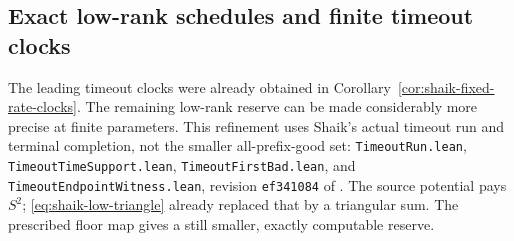\documentclass[11pt]{article}
\theoremstyle{remark}\newtheorem{remark}[proposition]{Remark}
\begin{document}
\subsection{Exact low-rank schedules and finite timeout clocks}
\label{subsec:shaik-low-schedule}
The leading timeout clocks were already obtained in
Corollary~\ref{cor:shaik-fixed-rate-clocks}. The remaining low-rank
reserve can be made considerably more precise at finite parameters.
This refinement uses Shaik's actual timeout run and terminal completion,
not the smaller all-prefix-good set:
\texttt{TimeoutRun.lean}, \texttt{TimeoutTimeSupport.lean},
\texttt{TimeoutFirstBad.lean}, and \texttt{TimeoutEndpointWitness.lean},
revision \texttt{ef341084} of \cite{Shaik2026v324}.
The source potential pays \(S^2\); \eqref{eq:shaik-low-triangle}
already replaced that by a triangular sum. The prescribed floor map
gives a still smaller, exactly computable reserve.
\end{document}
